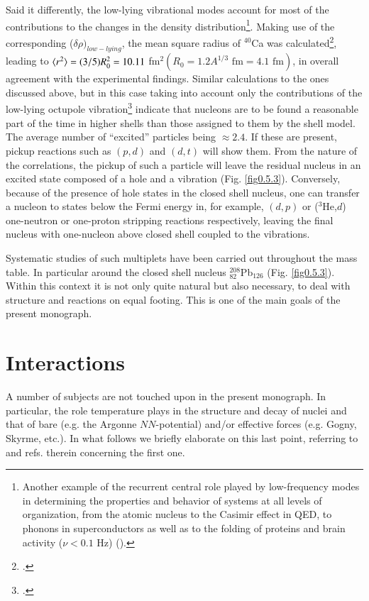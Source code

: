 Said it differently,  the low-lying vibrational modes  account for most of the contributions to the changes in the density distribution\footnote{Another example of the  recurrent central role played by low-frequency modes in determining the properties and behavior of systems at all levels of organization, from the atomic nucleus to the Casimir effect in QED, to phonons in superconductors as well as  to the folding of proteins and brain  activity ($\nu<0.1$ Hz) (\cite{Mitra:18}).}. Making use of the corresponding ($\delta\rho)_{low-lying}$, the mean square radius of $^{40}$Ca was calculated\footnote{\cite{Barranco:87a}.}, leading to $\langle {r^2} \rangle=(3/5)R_0^2=10.11$ fm$^2 (R_0=1.2A^{1/3}\text{ fm}=4.1\text{ fm})$, in overall agreement with the experimental findings. Similar calculations to the ones discussed above, but in this case taking into account only the contributions of the low-lying octupole vibration\footnote{\cite{Brown:63}.} indicate that nucleons are to be found a reasonable part of the time in higher shells than those assigned to them by the shell model. The average number of ``excited'' particles being $\approx2.4$. If these are present, pickup reactions such as $(p,d)$ and $(d,t)$ will show them. From the nature of the correlations, the pickup of such a particle will leave the residual nucleus in an excited state composed of a hole and a vibration (Fig. \ref{fig0.5.3}). Conversely, because of the presence of hole states in the closed shell nucleus, one can transfer a nucleon to states below the Fermi energy in, for example, $(d,p)$ or ($^3$He,$d$) one-neutron or one-proton stripping reactions respectively, leaving the final nucleus with one-nucleon above closed shell coupled to the vibrations.


Systematic studies of such multiplets have been carried out throughout the mass table. In particular around the closed shell nucleus $^{208}_{82}$Pb$_{126}$ (Fig. \ref{fig0.5.3}). Within this context it is not only  quite natural but also necessary, to deal with structure and reactions on equal footing.  This is one of the main goals of the present monograph. 
\section{Interactions}
A number of subjects are not touched upon in the present monograph. In particular, the role temperature plays in the structure and decay of nuclei and that of bare (e.g. the Argonne $NN$-potential) and/or effective forces (e.g. Gogny, Skyrme, etc.). In what follows we briefly elaborate on this last point, referring to \cite{Bortignon:98} and refs. therein concerning the first one.

